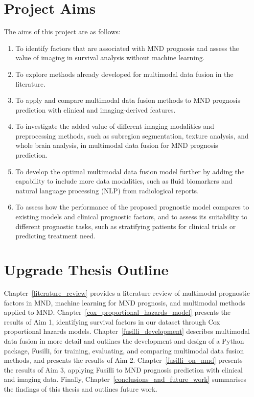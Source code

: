 \section{Project Aims}

The aims of this project are as follows:

\begin{enumerate}[label=Aim \arabic*:]
    \item To identify factors that are associated with MND prognosis and assess the value of imaging in survival analysis without machine learning.
    \item To explore methods already developed for multimodal data fusion in the literature.
    \item To apply and compare multimodal data fusion methods to MND prognosis prediction with clinical and imaging-derived features.
    \item To investigate the added value of different imaging modalities and preprocessing methods, such as subregion segmentation, texture analysis, and whole brain analysis, in multimodal data fusion for MND prognosis prediction.
    \item To develop the optimal multimodal data fusion model further by adding the capability to include more data modalities, such as fluid biomarkers and natural language processing (NLP) from radiological reports.
    \item To assess how the performance of the proposed prognostic model compares to existing models and clinical prognostic factors, and to assess its suitability to different prognostic tasks, such as stratifying patients for clinical trials or predicting treatment need.
\end{enumerate}


\section{Upgrade Thesis Outline}

Chapter~\ref{literature_review} provides a literature review of multimodal prognostic factors in MND, machine learning for MND prognosis, and multimodal methods applied to MND.
Chapter~\ref{cox_proportional_hazards_model} presents the results of Aim 1, identifying survival factors in our dataset through Cox proportional hazards models.
Chapter~\ref{fusilli_development} describes multimodal data fusion in more detail and outlines the development and design of a Python package, Fusilli, for training, evaluating, and comparing multimodal data fusion methods, and presents the results of Aim 2.
Chapter~\ref{fusilli_on_mnd} presents the results of Aim 3, applying Fusilli to MND prognosis prediction with clinical and imaging data.
Finally, Chapter~\ref{conclusions_and_future_work} summarises the findings of this thesis and outlines future work.